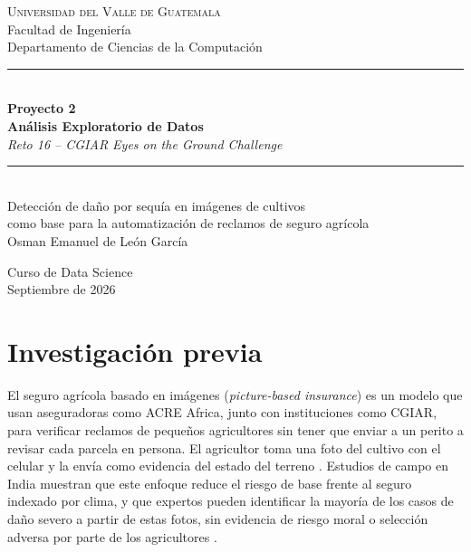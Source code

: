 \documentclass[11pt]{article}
\begin{document}
\begin{titlepage}
\centering

\vspace*{1cm}

{\large\textsc{Universidad del Valle de Guatemala}}\\[0.3cm]
{\large Facultad de Ingeniería}\\[0.15cm]
{\normalsize Departamento de Ciencias de la Computación}\\[2.5cm]

\rule{0.8\textwidth}{0.5pt}\\[0.6cm]

{\Huge\bfseries Proyecto 2}\\[0.4cm]
{\Large\bfseries Análisis Exploratorio de Datos}\\[0.5cm]
{\large\itshape Reto 16 -- CGIAR Eyes on the Ground Challenge}\\[0.6cm]

\rule{0.8\textwidth}{0.5pt}\\[2cm]

{\normalsize Detección de daño por sequía en imágenes de cultivos\\
como base para la automatización de reclamos de seguro agrícola}\\[3cm]

{\large Osman Emanuel de León García}

\vfill

{\normalsize Curso de Data Science}\\
{\normalsize Septiembre de 2026}

\end{titlepage}

\tableofcontents
\newpage

\section{Investigación previa}

El seguro agrícola basado en imágenes (\textit{picture-based insurance}) es un modelo que usan aseguradoras como ACRE Africa, junto con instituciones como CGIAR, para verificar reclamos de pequeños agricultores sin tener que enviar a un perito a revisar cada parcela en persona. El agricultor toma una foto del cultivo con el celular y la envía como evidencia del estado del terreno \cite{ceballos2018,ceballos2019}. Estudios de campo en India muestran que este enfoque reduce el riesgo de base frente al seguro indexado por clima, y que expertos pueden identificar la mayoría de los casos de daño severo a partir de estas fotos, sin evidencia de riesgo moral o selección adversa por parte de los agricultores \cite{ceballos2021}.
\end{document}
